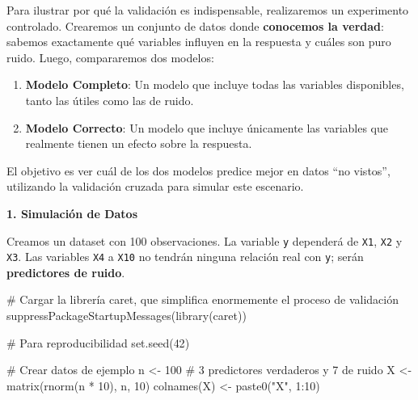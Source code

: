 \documentclass[
  letterpaper,
  DIV=11,
  numbers=noendperiod]{scrreprt}
\newenvironment{Shaded}{\begin{snugshade}}{\end{snugshade}}
\newcommand{\CommentTok}[1]{\textcolor[rgb]{0.37,0.37,0.37}{#1}}
\newcommand{\DecValTok}[1]{\textcolor[rgb]{0.68,0.00,0.00}{#1}}
\newcommand{\FunctionTok}[1]{\textcolor[rgb]{0.28,0.35,0.67}{#1}}
\newcommand{\NormalTok}[1]{\textcolor[rgb]{0.00,0.23,0.31}{#1}}
\newcommand{\OtherTok}[1]{\textcolor[rgb]{0.00,0.23,0.31}{#1}}
\newcommand{\SpecialCharTok}[1]{\textcolor[rgb]{0.37,0.37,0.37}{#1}}
\newcommand{\StringTok}[1]{\textcolor[rgb]{0.13,0.47,0.30}{#1}}
\providecommand{\tightlist}{%
  \setlength{\itemsep}{0pt}\setlength{\parskip}{0pt}}
\begin{document}
\begin{tcolorbox}[enhanced jigsaw, breakable, toprule=.15mm, bottomtitle=1mm, coltitle=black, colbacktitle=quarto-callout-tip-color!10!white, titlerule=0mm, opacitybacktitle=0.6, bottomrule=.15mm, toptitle=1mm, title=\textcolor{quarto-callout-tip-color}{\faLightbulb}\hspace{0.5em}{La maldición del sobreajuste}, arc=.35mm, rightrule=.15mm, opacityback=0, colframe=quarto-callout-tip-color-frame, leftrule=.75mm, left=2mm, colback=white]

Para ilustrar por qué la validación es indispensable, realizaremos un
experimento controlado. Crearemos un conjunto de datos donde
\textbf{conocemos la verdad}: sabemos exactamente qué variables influyen
en la respuesta y cuáles son puro ruido. Luego, compararemos dos
modelos:

\begin{enumerate}
\def\labelenumi{\arabic{enumi}.}
\tightlist
\item
  \textbf{Modelo Completo}: Un modelo que incluye todas las variables
  disponibles, tanto las útiles como las de ruido.
\item
  \textbf{Modelo Correcto}: Un modelo que incluye únicamente las
  variables que realmente tienen un efecto sobre la respuesta.
\end{enumerate}

El objetivo es ver cuál de los dos modelos predice mejor en datos ``no
vistos'', utilizando la validación cruzada para simular este escenario.

\textbf{1. Simulación de Datos}

Creamos un dataset con 100 observaciones. La variable \texttt{y}
dependerá de \texttt{X1}, \texttt{X2} y \texttt{X3}. Las variables
\texttt{X4} a \texttt{X10} no tendrán ninguna relación real con
\texttt{y}; serán \textbf{predictores de ruido}.

\begin{Shaded}
\begin{Highlighting}[]
\CommentTok{\# Cargar la librería \textquotesingle{}caret\textquotesingle{}, que simplifica enormemente el proceso de validación}
\FunctionTok{suppressPackageStartupMessages}\NormalTok{(}\FunctionTok{library}\NormalTok{(caret))}

\CommentTok{\# Para reproducibilidad}
\FunctionTok{set.seed}\NormalTok{(}\DecValTok{42}\NormalTok{)}

\CommentTok{\# Crear datos de ejemplo}
\NormalTok{n }\OtherTok{\textless{}{-}} \DecValTok{100}
\CommentTok{\# 3 predictores verdaderos y 7 de ruido}
\NormalTok{X }\OtherTok{\textless{}{-}} \FunctionTok{matrix}\NormalTok{(}\FunctionTok{rnorm}\NormalTok{(n }\SpecialCharTok{*} \DecValTok{10}\NormalTok{), n, }\DecValTok{10}\NormalTok{)}
\FunctionTok{colnames}\NormalTok{(X) }\OtherTok{\textless{}{-}} \FunctionTok{paste0}\NormalTok{(}\StringTok{"X"}\NormalTok{, }\DecValTok{1}\SpecialCharTok{:}\DecValTok{10}\NormalTok{)}


\end{Highlighting}
\end{Shaded}
\end{tcolorbox}
\end{document}
